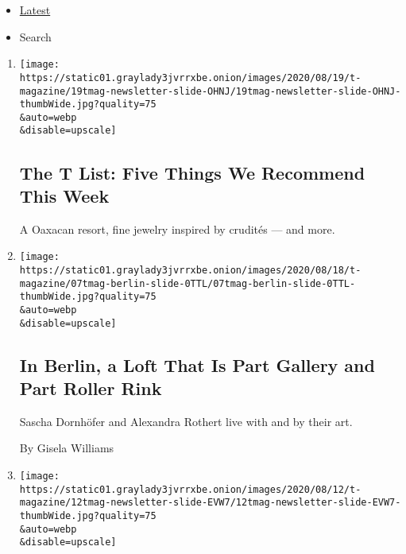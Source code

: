 \begin{itemize}
\tightlist
\item
  \protect\hyperlink{stream-panel}{Latest}
\item
  Search
\end{itemize}

\begin{enumerate}
\def\labelenumi{\arabic{enumi}.}
\item
  \href{/2020/08/20/t-magazine/monte-uzulu-vivanterre-emme-parsons.html}{}

  \texttt{[image: https://static01.graylady3jvrrxbe.onion/images/2020/08/19/t-magazine/19tmag-newsletter-slide-OHNJ/19tmag-newsletter-slide-OHNJ-thumbWide.jpg?quality=75\\\&auto=webp\\\&disable=upscale]}

  \hypertarget{the-t-list-five-things-we-recommend-this-week}{%
  \subsection{The T List: Five Things We Recommend This
  Week}\label{the-t-list-five-things-we-recommend-this-week}}

  A Oaxacan resort, fine jewelry inspired by crudités --- and more.
\item
  \href{/2020/08/19/t-magazine/berlin-infamous-skating-couple-design.html}{}

  \texttt{[image: https://static01.graylady3jvrrxbe.onion/images/2020/08/18/t-magazine/07tmag-berlin-slide-0TTL/07tmag-berlin-slide-0TTL-thumbWide.jpg?quality=75\\\&auto=webp\\\&disable=upscale]}

  \hypertarget{in-berlin-a-loft-that-is-part-gallery-and-part-roller-rink}{%
  \subsection{In Berlin, a Loft That Is Part Gallery and Part Roller
  Rink}\label{in-berlin-a-loft-that-is-part-gallery-and-part-roller-rink}}

  Sascha Dornhöfer and Alexandra Rothert live with and by their art.

  By Gisela Williams
\item
  \href{/2020/08/13/t-magazine/inque-postcards-rain-boots.html}{}

  \texttt{[image: https://static01.graylady3jvrrxbe.onion/images/2020/08/12/t-magazine/12tmag-newsletter-slide-EVW7/12tmag-newsletter-slide-EVW7-thumbWide.jpg?quality=75\\\&auto=webp\\\&disable=upscale]}

  \hypertarget{the-t-list-five-things-we-recommend-this-week-1}{%
}
\end{enumerate}
